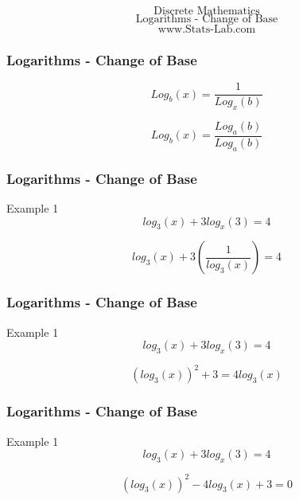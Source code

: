 \documentclass{beamer}
\begin{document}
\begin{frame}
{
\huge
\[ \mbox{Discrete Mathematics} \]
\[ \mbox{Logarithms - Change of Base} \]
}
{
\Large
\[ \mbox{www.Stats-Lab.com} \]
}
\end{frame}
\begin{frame}
\frametitle{Logarithms - Change of Base}
\Large
\[ Log_b(x) = \frac{1}{Log_x(b)}  \]

\[ Log_b(x) = \frac{Log_a(b)}{Log_a(b)}  \]


\end{frame}
\begin{frame}
\frametitle{Logarithms - Change of Base}
\Large
Example 1
\[ log_3(x) + 3 log_x(3) = 4  \]

\[ log_3(x) + 3 \left(\frac{1}{log_3(x)} \right)  = 4  \]
\end{frame}
\begin{frame}
\frametitle{Logarithms - Change of Base}
\Large
Example 1
\[ log_3(x) + 3 log_x(3) = 4  \]

\[ \left(log_3(x)\right)^2 + 3  = 4 log_3(x)  \]
\end{frame}
\begin{frame}
\frametitle{Logarithms - Change of Base}
\Large
Example 1
\[ log_3(x) + 3 log_x(3) = 4  \]

\[ \left(log_3(x)\right)^2 - 4 log_3(x) + 3  = 0  \]
\end{frame}
\end{document}
